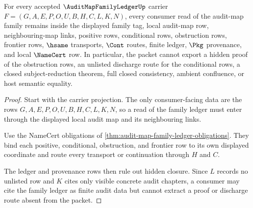 \begin{theorem}
\label{thm:audit-map-family-ledger-nonescape}
For every accepted $\AuditMapFamilyLedgerUp$ carrier $F=(G,A,E,P,O,U,B,H,C,L,K,N)$, every consumer read of the audit-map family remains inside the displayed family tag, local audit-map row, neighbouring-map links, positive rows, conditional rows, obstruction rows, frontier rows, $\hsame$ transports, $\Cont$ routes, finite ledger, $\Pkg$ provenance, and local $\NameCert$ row. In particular, the packet cannot export a hidden proof of the obstruction rows, an unlisted discharge route for the conditional rows, a closed subject-reduction theorem, full closed consistency, ambient confluence, or host semantic equality.
\end{theorem}
\begin{proof}
Start with the carrier projection. The only consumer-facing data are the rows $G,A,E,P,O,U,B,H,C,L,K,N$, so a read of the family ledger must enter through the displayed local audit map and its neighbouring links.

Use the NameCert obligations of \autoref{thm:audit-map-family-ledger-obligations}. They bind each positive, conditional, obstruction, and frontier row to its own displayed coordinate and route every transport or continuation through $H$ and $C$.

The ledger and provenance rows then rule out hidden closure. Since $L$ records no unlisted row and $K$ cites only visible concrete audit chapters, a consumer may cite the family ledger as finite audit data but cannot extract a proof or discharge route absent from the packet.
\end{proof}


\begin{closurestatus}{\AuditMapFamilyLedgerUp}
  \theoryclosure{\seedClosure}
  \formalstatus{\unformalizedV}
\end{closurestatus}
